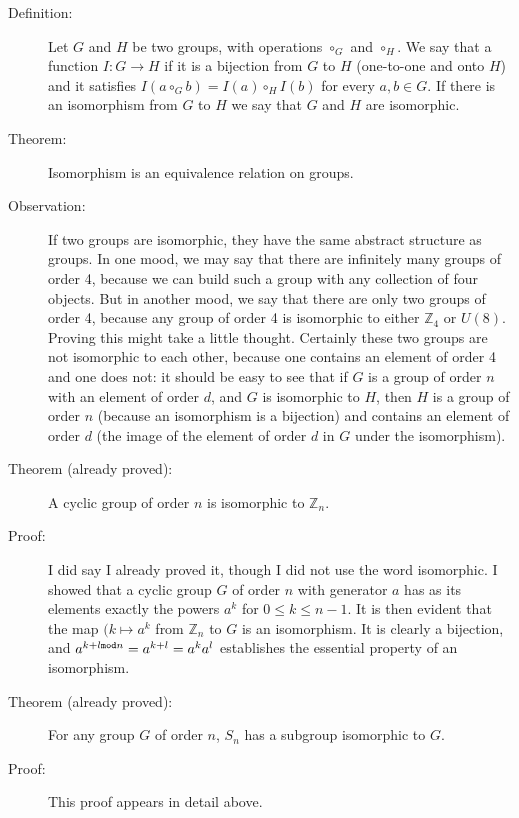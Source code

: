 \documentclass[12pt]{article}
\begin{document}
\begin{description}

\item[Definition:]  Let $G$ and $H$ be two groups, with operations $\circ_G$ and $\circ_H$.  We say that a function $I:G \rightarrow H$ if it is a bijection
from $G$ to $H$ (one-to-one and onto $H$) and it satisfies $I(a \circ_G b) = I(a) \circ_H I(b)$ for every $a,b \in G$.  If there is an isomorphism from $G$ to $H$
we say that $G$ and $H$ are isomorphic.

\item[Theorem:]  Isomorphism is an equivalence relation on groups.

\item[Observation:]  If two groups are isomorphic, they have the same abstract structure as groups.  In one mood, we may say that there are infinitely
many groups of order 4, because we can build such a group with any collection of four objects.  But in another mood, we say that there are only two groups of
order 4, because any group of order 4 is isomorphic to either ${\mathbb Z}_4$ or $U(8)$.  Proving this might take a little thought.  Certainly these two groups are not isomorphic to each other, because one contains an element of order 4
and one does not:  it should be easy to see that if $G$ is a group of order $n$ with an element of order $d$, and $G$ is isomorphic to $H$, then $H$ is a group of order $n$ (because an isomorphism is a bijection) and contains an element of order $d$ (the image of the element of order $d$ 
in $G$ under the isomorphism).

\item[Theorem (already proved):]  A cyclic group of order $n$ is isomorphic to ${\mathbb Z}_n$.

\item[Proof:]  I did say I already proved it, though I did not use the word isomorphic.  I showed that a cyclic group $G$ of order $n$ with generator $a$ has as its elements
exactly the powers $a^k$ for $0 \leq k \leq n-1$.  It is then evident that the map $(k \mapsto a^k$ from ${\mathbb Z}_n$ to $G$ is an isomorphism.  It is clearly a bijection,
and $a^{k+l {\tt mod}n} = a^{k+l} = a^ka^l$ establishes the essential property of an isomorphism.

\item[Theorem (already proved):]  For any group $G$ of order $n$, $S_n$ has a subgroup isomorphic to $G$.

\item[Proof:]  This proof appears in detail above.


\end{description}
\end{document}
